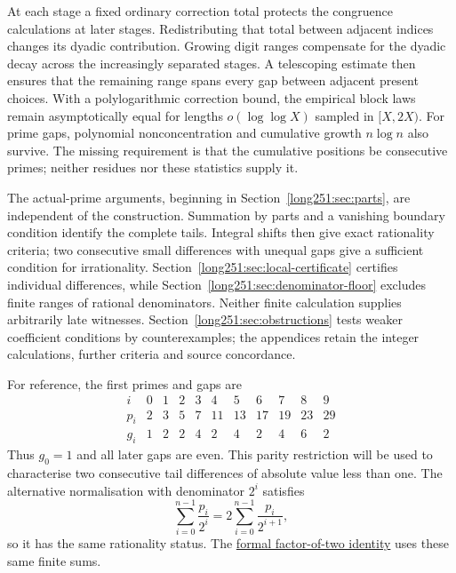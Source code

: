 \documentclass[11pt]{article}
\begin{document}
At each stage a fixed ordinary correction total protects the congruence
calculations at later stages.  Redistributing that total between adjacent
indices changes its dyadic contribution.  Growing digit ranges compensate for the dyadic decay
across the increasingly separated stages.
A telescoping estimate then ensures that the remaining range spans every
gap between adjacent present choices.
With a polylogarithmic correction bound, the empirical block laws remain
asymptotically equal for lengths $o(\log\log X)$ sampled in $[X,2X)$.
For prime gaps, polynomial nonconcentration and cumulative growth
$n\log n$ also survive.  The missing requirement is that the cumulative
positions be consecutive primes; neither residues nor these statistics
supply it.

The actual-prime arguments, beginning in Section~\ref{long251:sec:parts},
are independent of the construction.  Summation by parts and a vanishing
boundary condition identify the complete tails.  Integral shifts then
give exact rationality criteria; two consecutive small differences with
unequal gaps give a sufficient condition for irrationality.  Section~\ref{long251:sec:local-certificate}
certifies individual differences, while
Section~\ref{long251:sec:denominator-floor} excludes finite ranges of
rational denominators.  Neither finite calculation supplies arbitrarily
late witnesses.  Section~\ref{long251:sec:obstructions} tests weaker
coefficient conditions by counterexamples; the appendices retain the
integer calculations, further criteria and source concordance.

For reference, the first primes and gaps are
\[
 \begin{array}{c|cccccccccc}
  i   & 0&1&2&3&4 &5 &6 &7 &8 &9\\\hline
  p_i & 2&3&5&7&11&13&17&19&23&29\\
  g_i & 1&2&2&4&2 &4 &2&4&6&2
 \end{array}
\]
Thus $g_0=1$ and all later gaps are even.  This parity restriction will be
used to characterise two consecutive tail differences of absolute value
less than one.  The alternative normalisation with denominator $2^i$ satisfies
\[
 \sum_{i=0}^{n-1}\frac{p_i}{2^i}
 =2\sum_{i=0}^{n-1}\frac{p_i}{2^{i+1}},
\]
so it has the same rationality status.  The
\href{https://github.com/wcook04/plectis-erdos/blob/3d6d938d696fed0fb71dd55115a18a73738ff223/lean/ErdosProblems/Erdos251/PrimeGapDyadicTail.lean\#L111}{formal factor-of-two identity}
uses these same finite sums.
\end{document}
